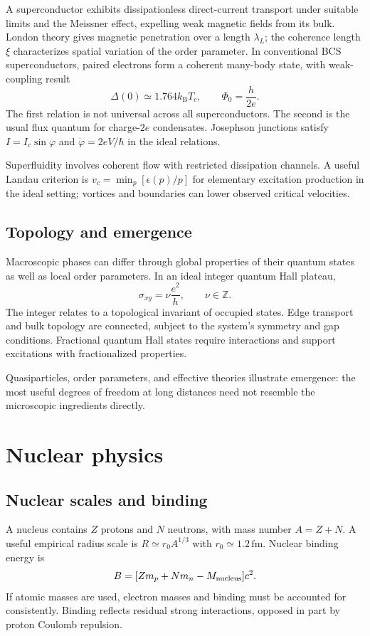 \documentclass[11pt,oneside]{book}
\newcommand{\kb}{k_{\mathrm B}}
\theoremstyle{reviewstyle}
\begin{document}
A superconductor exhibits dissipationless direct-current transport under suitable limits and the Meissner effect, expelling weak magnetic fields from its bulk. London theory gives magnetic penetration over a length $\lambda_L$; the coherence length $\xi$ characterizes spatial variation of the order parameter. In conventional BCS superconductors, paired electrons form a coherent many-body state, with weak-coupling result
\begin{equation}\Delta(0)\simeq1.764\kb T_c,\qquad \Phi_0=\frac{h}{2e}.\end{equation}
The first relation is not universal across all superconductors. The second is the usual flux quantum for charge-$2e$ condensates. Josephson junctions satisfy $I=I_c\sin\varphi$ and $\dot\varphi=2eV/\hbar$ in the ideal relations.

Superfluidity involves coherent flow with restricted dissipation channels. A useful Landau criterion is $v_c=\min_p[\epsilon(p)/p]$ for elementary excitation production in the ideal setting; vortices and boundaries can lower observed critical velocities.
\section{Topology and emergence}
Macroscopic phases can differ through global properties of their quantum states as well as local order parameters. In an ideal integer quantum Hall plateau,
\begin{equation}\sigma_{xy}=\nu\frac{e^2}{h},\qquad \nu\in\mathbb Z.\end{equation}
The integer relates to a topological invariant of occupied states. Edge transport and bulk topology are connected, subject to the system's symmetry and gap conditions. Fractional quantum Hall states require interactions and support excitations with fractionalized properties.

Quasiparticles, order parameters, and effective theories illustrate emergence: the most useful degrees of freedom at long distances need not resemble the microscopic ingredients directly.

\chapter{Nuclear physics}
\section{Nuclear scales and binding}
A nucleus contains $Z$ protons and $N$ neutrons, with mass number $A=Z+N$. A useful empirical radius scale is $R\simeq r_0A^{1/3}$ with $r_0\simeq1.2\,\mathrm{fm}$. Nuclear binding energy is
\begin{equation}B=[Zm_p+Nm_n-M_{\rm nucleus}]c^2.\end{equation}
If atomic masses are used, electron masses and binding must be accounted for consistently. Binding reflects residual strong interactions, opposed in part by proton Coulomb repulsion.
\end{document}
